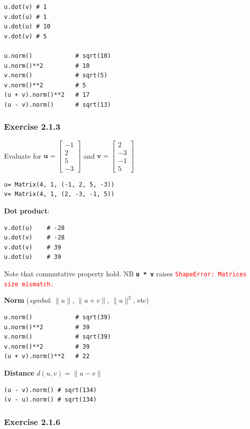 \begin{verbatim}
u.dot(v) # 1
v.dot(u) # 1
u.dot(u) # 10
v.dot(v) # 5

u.norm()            # sqrt(10)
u.norm()**2         # 10
v.norm()            # sqrt(5)
v.norm()**2         # 5
(u + v).norm()**2   # 17
(u - v).norm()      # sqrt(13)
\end{verbatim}

\subsubsection{Exercise 2.1.3}
Evaluate for
$\mathbf{u} = \left[\begin{matrix}-1\\2\\5\\-3\end{matrix}\right]$ and
$\mathbf{v} = \left[\begin{matrix}2\\-3\\-1\\5\end{matrix}\right]$

\begin{verbatim}
u= Matrix(4, 1, (-1, 2, 5, -3))
v= Matrix(4, 1, (2, -3, -1, 5))
\end{verbatim}

\textbf{Dot product}:

\begin{verbatim}
v.dot(u)    # -28
u.dot(v)    # -28  
v.dot(v)    # 39
u.dot(u)    # 39
\end{verbatim}

Note that commutative property hold. NB \textbf{\texttt{u * v}} raises \texttt{\textcolor{red}{ShapeError: Matrices size mismatch.}}

\textbf{Norm} (\emph{symbol}: $\|u\|$, $\|u + v\|$, $\|u\|^2$, etc)

\begin{verbatim}
u.norm()            # sqrt(39)
u.norm()**2         # 39
v.norm()            # sqrt(39)
v.norm()**2         # 39
(u + v).norm()**2   # 22
\end{verbatim}

\textbf{Distance} $d(u, v) = \| u - v \|$

\begin{verbatim}
(u - v).norm() # sqrt(134)
(v - u).norm() # sqrt(134)
\end{verbatim}

\subsubsection{Exercise 2.1.6}


